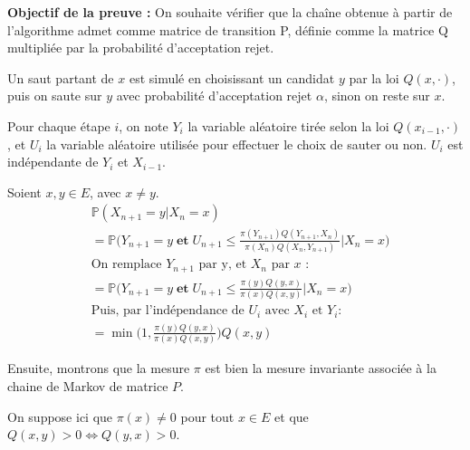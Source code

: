 \documentclass{article}
\begin{document}
\begin{tcolorbox}[colback=white,colframe=green!80!black,title=Démonstration]
    \vspace{1em}

    \textbf{Objectif de la preuve :} On souhaite vérifier que la chaîne obtenue à partir de l'algorithme admet comme matrice de transition P, définie comme la matrice Q multipliée par la probabilité d'acceptation rejet.
    \vspace{1em}

    Un saut partant de $x$ est simulé en choisissant un candidat $y$ par la loi $Q(x, \cdot)$, puis on saute sur $y$ avec probabilité d'acceptation rejet $\alpha$, sinon on reste sur $x$.
    \vspace{1em}

    Pour chaque étape $i$, on note $Y_i$ la variable aléatoire tirée selon la loi $Q(x_{i-1}, \cdot)$, et $U_i$ la variable aléatoire utilisée pour effectuer le choix de sauter ou non. $U_i$ est indépendante de $Y_i$ et $X_{i-1}$.
    \vspace{1em}

    Soient $x, y \in E$, avec $x \neq y$.\\
    \begin{align*}
        &\mathbb{P}(X_{n+1} = y | X_n = x) \\
        &= \mathbb{P}\big( Y_{n+1} = y
        \mathbf{\;et\;} U_{n+1} \leq \frac{\pi(Y_{n+1}) Q(Y_{n+1}, X_n)}{\pi(X_n) Q(X_n, Y_{n+1})} \big| X_n = x \big) \\
        &\text{On remplace $Y_{n+1}$ par y, et $X_n$ par $x$ :}\\
        &= \mathbb{P}\big( Y_{n+1} = y
        \mathbf{\;et\;} U_{n+1} \leq \frac{\pi(y) Q(y, x)}{\pi(x) Q(x, y)} \big| X_n = x \big)\\
        &\text{Puis, par l'indépendance de $U_i$ avec $X_i$ et $Y_i$} :\\
        &= \min\big(1, \frac{\pi(y) Q(y, x)}{\pi(x) Q(x, y)} \big)Q(x, y)
    \end{align*}
\end{tcolorbox}

Ensuite, montrons que la mesure $\pi$ est bien la mesure invariante associée à la chaine de Markov de matrice $P$.

On suppose ici que $\pi(x) \neq 0$ pour tout $x \in E$ et que $Q(x, y) > 0 \iff Q(y, x) > 0$.
\end{document}
